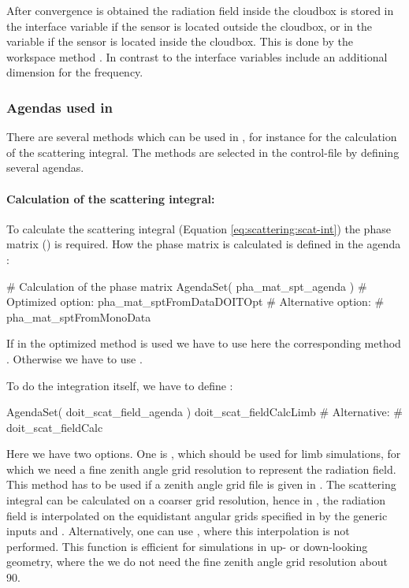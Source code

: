 After convergence is obtained the radiation field inside the
cloudbox is stored in the interface variable  if
the sensor is located outside the cloudbox, or in the variable 
 if the sensor is located inside
the cloudbox. This is done by the workspace method
. In contrast to
 the interface 
variables include an additional dimension for the frequency.


\subsubsection{Agendas used in }

There are several methods which can be used in
, for instance for the calculation of
the scattering integral. The methods are selected in the control-file by
defining several agendas.

\paragraph{Calculation of the scattering integral:}

To calculate the scattering integral (Equation \ref{eq:scattering:scat-int})
the phase matrix () is required. How 
the phase matrix is calculated is defined in the agenda
:
\begin{code}
# Calculation of the phase matrix
AgendaSet( pha_mat_spt_agenda ){
 # Optimized option:
   pha_mat_sptFromDataDOITOpt
 # Alternative option:
 #  pha_mat_sptFromMonoData
}
\end{code}
If in 
the optimized method  is used we
have to use here the corresponding method
. Otherwise we have to use
.

To do the integration itself, we have to define
:
\begin{code}
AgendaSet( doit_scat_field_agenda ){
 doit_scat_fieldCalcLimb
 # Alternative: 
 # doit_scat_fieldCalc
}
\end{code}
Here we have two options. One is ,
which should be used for limb simulations, for which we need a fine
zenith angle grid resolution to represent the radiation field. This
method has to be used if a zenith angle grid file is given in
. The
scattering integral can be calculated on a coarser grid resolution, hence
in , the radiation field is
interpolated on the equidistant angular grids specified in
 by the generic inputs  and
. Alternatively, one can use 
, where this interpolation is not 
performed. This function is efficient for simulations in up- or
down-looking geometry, where the we do not need the fine zenith angle
grid resolution about 90\degree. 

